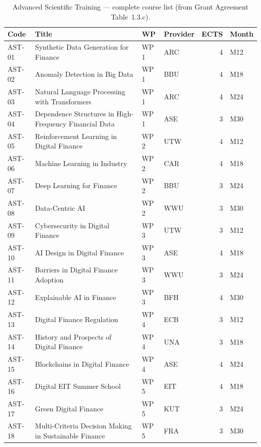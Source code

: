 \begin{table}[h]
\centering
\small
\begin{tabularx}{\textwidth}{@{}l X l l r l@{}}
  \toprule
  \textbf{Code} & \textbf{Title} & \textbf{WP} & \textbf{Provider} & \textbf{ECTS} & \textbf{Month} \\
  \midrule
  AST-01 & Synthetic Data Generation for Finance                    & WP\,1 & ARC & 4 & M12 \\
  AST-02 & Anomaly Detection in Big Data                            & WP\,1 & BBU & 4 & M18 \\
  AST-03 & Natural Language Processing with Transformers             & WP\,1 & ARC & 4 & M24 \\
  AST-04 & Dependence Structures in High-Frequency Financial Data   & WP\,1 & ASE & 3 & M30 \\
  AST-05 & Reinforcement Learning in Digital Finance                & WP\,2 & UTW & 4 & M12 \\
  AST-06 & Machine Learning in Industry                             & WP\,2 & CAR & 4 & M18 \\
  AST-07 & Deep Learning for Finance                                & WP\,2 & BBU & 3 & M24 \\
  AST-08 & Data-Centric AI                                          & WP\,2 & WWU & 3 & M30 \\
  AST-09 & Cybersecurity in Digital Finance                         & WP\,3 & UTW & 3 & M12 \\
  AST-10 & AI Design in Digital Finance                             & WP\,3 & ASE & 4 & M18 \\
  AST-11 & Barriers in Digital Finance Adoption                     & WP\,3 & WWU & 3 & M24 \\
  AST-12 & Explainable AI in Finance                                & WP\,3 & BFH & 4 & M30 \\
  AST-13 & Digital Finance Regulation                               & WP\,4 & ECB & 3 & M12 \\
  AST-14 & History and Prospects of Digital Finance                  & WP\,4 & UNA & 3 & M18 \\
  AST-15 & Blockchains in Digital Finance                           & WP\,4 & ASE & 4 & M24 \\
  AST-16 & Digital EIT Summer School                                & WP\,5 & EIT & 4 & M18 \\
  AST-17 & Green Digital Finance                                    & WP\,5 & KUT & 3 & M24 \\
  AST-18 & Multi-Criteria Decision Making in Sustainable Finance    & WP\,5 & FRA & 3 & M30 \\
  \bottomrule
\end{tabularx}
\caption{Advanced Scientific Training --- complete course list (from Grant Agreement Table~1.3.c).}
\label{tab:elective-list}
\end{table}

